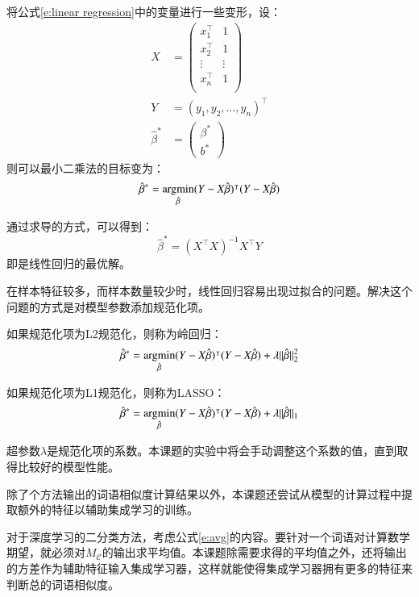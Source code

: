将公式\ref{e:linear regression}中的变量进行一些变形，设：
\begin{align}
	X &=
	\begin{pmatrix}
		x^\intercal_1 & 1 \\
		x^\intercal_2 & 1 \\
		\vdots & \vdots \\
		x^\intercal_n & 1 \\
	\end{pmatrix} \\
	Y &= (y_1, y_2, \dots, y_n)^\intercal\\
	\hat{\beta}^* &=
	\begin{pmatrix}
		\beta^* \\
		b^*
	\end{pmatrix}
\end{align}
则可以最小二乘法的目标变为：
\begin{equation}
\hat{\beta}^* = \operatorname*{argmin}_{\hat{\beta}} (Y - X \hat{\beta})^\intercal (Y - X \hat{\beta})
\end{equation}

通过求导的方式，可以得到：
\begin{equation}
\hat{\beta}^* = (X^\intercal X)^{-1} X^\intercal Y
\end{equation}
即是线性回归的最优解。

在样本特征较多，而样本数量较少时，线性回归容易出现过拟合的问题。解决这个问题的方式是对模型参数添加规范化项。

如果规范化项为L2规范化，则称为岭回归：
\begin{equation}
\hat{\beta}^* = \operatorname*{argmin}_{\hat{\beta}} (Y - X \hat{\beta})^\intercal (Y - X \hat{\beta}) + \lambda ||\hat{\beta}||^2_2
\end{equation}

如果规范化项为L1规范化，则称为LASSO：
\begin{equation}
\hat{\beta}^* = \operatorname*{argmin}_{\hat{\beta}} (Y - X \hat{\beta})^\intercal (Y - X \hat{\beta}) + \lambda ||\hat{\beta}||_1
\end{equation}

超参数$\lambda$是规范化项的系数。本课题的实验中将会手动调整这个系数的值，直到取得比较好的模型性能。

\label{s:ensemble features}
除了个方法输出的词语相似度计算结果以外，本课题还尝试从模型的计算过程中提取额外的特征以辅助集成学习的训练。

对于深度学习的二分类方法，考虑公式\ref{e:avg}的内容。要针对一个词语对计算数学期望，就必须对$M_\mathcal{C}$的输出求平均值。本课题除需要求得的平均值之外，还将输出的方差作为辅助特征输入集成学习器，这样就能使得集成学习器拥有更多的特征来判断总的词语相似度。

